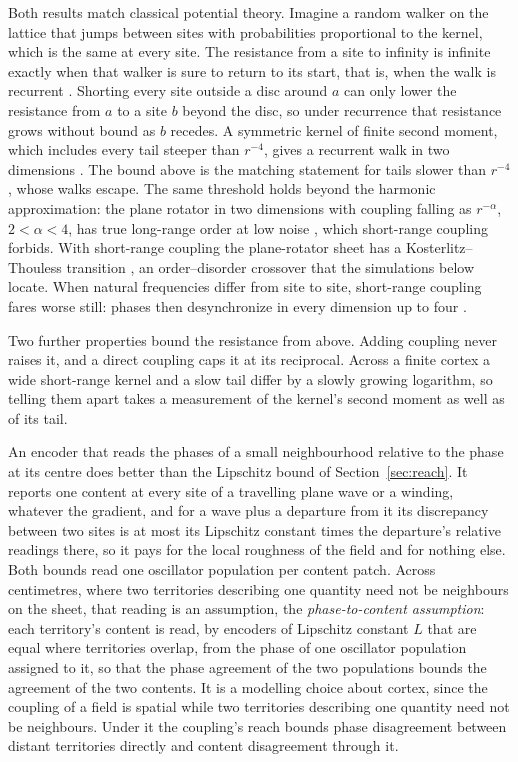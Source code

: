 \documentclass[12pt]{article}
\begin{document}
Both results match classical potential theory. Imagine a random walker on the
lattice that jumps between sites with probabilities proportional to the kernel,
which is the same at every site. The resistance from a site to infinity is
infinite exactly when that walker is sure to return to its start, that is, when
the walk is recurrent \citep{doyle1984}. Shorting every site outside a disc
around $a$ can only lower the resistance from $a$ to a site $b$ beyond the disc,
so under recurrence that resistance grows without bound as $b$ recedes. A
symmetric kernel of finite second moment, which includes every tail steeper
than $r^{-4}$, gives a recurrent walk in two dimensions \citep{chung1951}. The
bound above is the matching statement for tails slower than $r^{-4}$, whose
walks escape. The same threshold holds beyond the harmonic approximation: the
plane rotator in two dimensions with coupling falling as $r^{-\alpha}$,
$2<\alpha<4$, has true long-range order at low noise \citep{kunz1976}, which
short-range coupling forbids. With short-range coupling the plane-rotator sheet
has a Kosterlitz--Thouless transition \citep{frohlich1981}, an order--disorder
crossover that the simulations below locate. When natural frequencies differ
from site to site, short-range coupling fares worse still: phases then
desynchronize in every dimension up to four \citep{hong2005}.

Two further properties bound the resistance from above. Adding coupling never
raises it, and a direct coupling caps it at its reciprocal. Across a finite
cortex a wide short-range kernel and a slow tail differ by a slowly growing
logarithm, so telling them apart takes a measurement of the kernel's second
moment as well as of its tail.

An encoder that reads the phases of a small neighbourhood relative to the phase
at its centre does better than the Lipschitz bound of Section~\ref{sec:reach}.
It reports one content at every site of a travelling plane wave or a winding,
whatever the gradient, and for a wave plus a departure from it its discrepancy
between two sites is at most its Lipschitz constant times the departure's
relative readings there, so it pays for the local roughness of the field and
for nothing else. Both bounds read one oscillator population per content patch.
Across centimetres, where two territories describing one quantity need not be
neighbours on the sheet, that reading is an assumption, the
\emph{phase-to-content assumption}: each territory's content is read, by
encoders of Lipschitz constant $L$ that are equal where territories overlap,
from the phase of one oscillator population assigned to it, so that the phase
agreement of the two populations bounds the agreement of the two contents. It
is a modelling choice about cortex, since the coupling of a field is spatial
while two territories describing one quantity need not be neighbours. Under it
the coupling's reach bounds phase disagreement between distant territories
directly and content disagreement through it.
\end{document}
